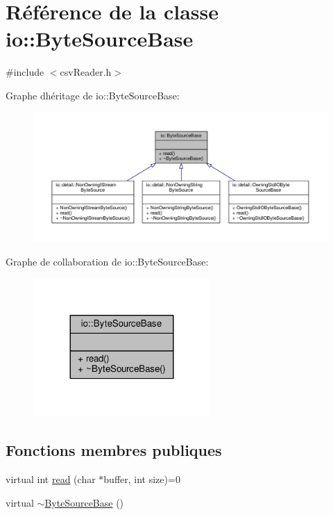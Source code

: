 \hypertarget{classio_1_1ByteSourceBase}{}\section{Référence de la classe io\+:\+:Byte\+Source\+Base}
\label{classio_1_1ByteSourceBase}


{\ttfamily \#include $<$csv\+Reader.\+h$>$}



Graphe d\textquotesingle{}héritage de io\+:\+:Byte\+Source\+Base\+:
\nopagebreak
\begin{figure}[H]
\begin{center}
\leavevmode
\includegraphics[width=350pt]{classio_1_1ByteSourceBase__inherit__graph}
\end{center}
\end{figure}


Graphe de collaboration de io\+:\+:Byte\+Source\+Base\+:
\nopagebreak
\begin{figure}[H]
\begin{center}
\leavevmode
\includegraphics[width=191pt]{classio_1_1ByteSourceBase__coll__graph}
\end{center}
\end{figure}
\subsection*{Fonctions membres publiques}
\begin{DoxyCompactItemize}
\item 
virtual int \hyperlink{classio_1_1ByteSourceBase_a9598bcc869b79e44da07f0e6fa478615}{read} (char $\ast$buffer, int size)=0
\item 
virtual \hyperlink{classio_1_1ByteSourceBase_ac3228fe608b3268e49c2243d668d6efd}{$\sim$\+Byte\+Source\+Base} ()
\end{DoxyCompactItemize}


